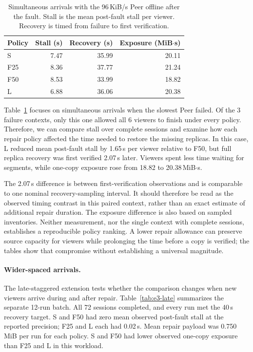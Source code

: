\begin{table}[ht]
\centering\small
\caption{Simultaneous arrivals with the 96\,KiB/s Peer offline after
the fault. Stall is the mean post-fault stall per viewer. Recovery is timed from failure to first verification.}
\label{tab:e3-slowest}
\begin{tabular}{@{}lrrr@{}}
\toprule
Policy & Stall (s) & Recovery (s) & Exposure (MiB$\cdot$s) \\
\midrule
S & 7.47 & 35.99 & 20.11 \\
F25 & 8.36 & 37.77 & 21.24 \\
F50 & 8.53 & 33.99 & 18.82 \\
L & 6.88 & 36.06 & 20.38 \\
\bottomrule
\end{tabular}
\end{table}

Table~\ref{tab:e3-slowest} focuses on simultaneous arrivals when the slowest Peer failed.
Of the 3 failure contexts, only this one allowed all 6 viewers to finish under every policy.
Therefore, we can compare stall over complete sessions and examine how each repair policy
affected the time needed to restore the missing replicas.
In this case, L reduced mean post-fault stall by
1.65\,s per viewer relative to F50, but full replica recovery was first
verified 2.07\,s later. Viewers spent less time waiting for segments,
while one-copy exposure rose from 18.82 to 20.38\,MiB$\cdot$s.

The 2.07\,s difference is between first-verification observations and is
comparable to one nominal recovery-sampling interval. It should therefore
be read as the observed timing contrast in this paired context, rather
than an exact estimate of additional repair duration. The exposure
difference is also based on sampled inventories. Neither measurement,
nor the single context with complete sessions, establishes a reproducible
policy ranking. A lower repair allowance can preserve source capacity for
viewers while prolonging the time before a copy is verified; the tables
show that compromise without establishing a universal magnitude.

\paragraph{Wider-spaced arrivals.}
The late-staggered extension tests whether the comparison changes when
new viewers arrive during and after repair. Table~\ref{tab:e3-late}
summarizes the separate 12-run batch. All 72 sessions completed, and every
run met the 40\,s recovery target. S and F50 had zero mean observed
post-fault stall at the reported precision; F25 and L each had 0.02\,s.
Mean repair payload was 0.750\,MiB per run for each policy. S and F50 had lower observed
one-copy exposure than F25 and L in this workload.

